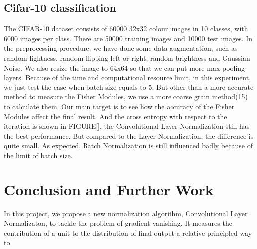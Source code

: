 \documentclass{sig-alternate}
\begin{document}
    \subsection{Cifar-10 classification}
    The CIFAR-10 dataset consists of 60000 32x32 colour images in 10 classes, with 6000 images per class. There are 50000 training images and 10000 test images.
    In the preprocessing procedure, we have done some data augmentation, such as random lightness, random flipping left or right, random brightness and Gaussian Noise. We also resize the image to 64x64 so that we can put more max pooling layers. Because of the time and computational resource limit, in this experiment, we just test the case when batch size equals to 5. But other than a more accurate method to measure the Fisher Modules, we use a more coarse grain method(15) to calculate them. Our main target is to see how the accuracy of the Fisher Modules affect the final result. And the cross entropy with respect to the iteration is shown in FIGURE[], the Convolutional Layer Normalization still has the best performance. But compared to the Layer Normalization, the difference is quite small. As expected, Batch Normalization is still influenced badly because of the limit of batch size. 

\section{Conclusion and Further Work}
    In this project, we propose a new normalization algorithm, Convolutional Layer Normalizaton, to tackle the problem of gradient vanishing. It measures the contribution of a unit to the distribution of final output a relative principled way to 

 
\end{document}
